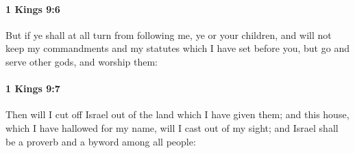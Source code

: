 		\paragraph{1 Kings 9:6} %
			\label{1KINGS-9-6}

			But if ye shall at all turn from following me, ye or your children, and will not keep my commandments and my statutes which I have set before you, but go and serve other gods, and worship them:


		\paragraph{1 Kings 9:7} %
			\label{1KINGS-9-7}

			Then will I cut off Israel out of the land which I have given them; and this house, which I have hallowed for my name, will I cast out of my sight; and Israel shall be a proverb and a byword among all people:

